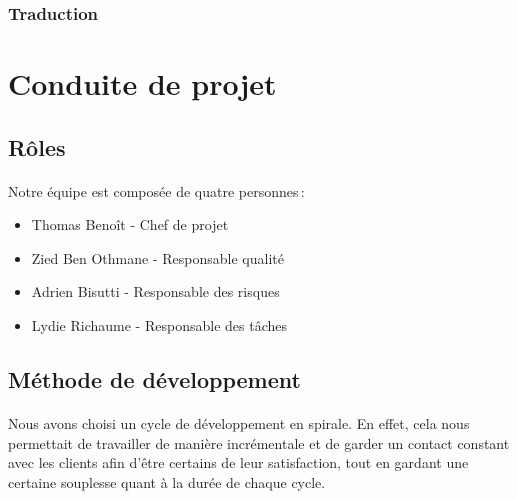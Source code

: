 \documentclass{scrartcl}
\begin{document}
\subsubsection{Traduction} %
\paragraph{}

\newpage


\section{Conduite de projet}

\subsection{Rôles}
\paragraph{}
Notre équipe est composée de quatre personnes\,: 
\begin{itemize}
    \item Thomas Benoît - Chef de projet
    \item Zied Ben Othmane - Responsable qualité
    \item Adrien Bisutti - Responsable des risques
    \item Lydie Richaume - Responsable des tâches
\end{itemize}

\subsection{Méthode de développement}
\paragraph{}
Nous avons choisi un cycle de développement en spirale. En effet, cela nous permettait de travailler de manière incrémentale et de garder un contact constant avec les clients afin d'être certains de leur satisfaction, tout en gardant une certaine souplesse quant à la durée de chaque cycle.

\end{document}

